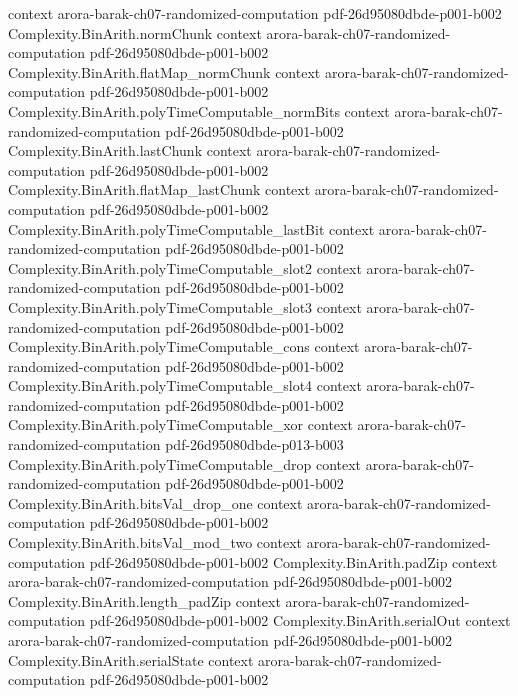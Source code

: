 \begin{theorem}
  {context}
  {arora-barak-ch07-randomized-computation}
  {pdf-26d95080dbde-p001-b002}
\proofstep
  {Complexity.BinArith.normChunk}
  {context}
  {arora-barak-ch07-randomized-computation}
  {pdf-26d95080dbde-p001-b002}
\proofstep
  {Complexity.BinArith.flatMap_normChunk}
  {context}
  {arora-barak-ch07-randomized-computation}
  {pdf-26d95080dbde-p001-b002}
\proofstep
  {Complexity.BinArith.polyTimeComputable_normBits}
  {context}
  {arora-barak-ch07-randomized-computation}
  {pdf-26d95080dbde-p001-b002}
\proofstep
  {Complexity.BinArith.lastChunk}
  {context}
  {arora-barak-ch07-randomized-computation}
  {pdf-26d95080dbde-p001-b002}
\proofstep
  {Complexity.BinArith.flatMap_lastChunk}
  {context}
  {arora-barak-ch07-randomized-computation}
  {pdf-26d95080dbde-p001-b002}
\proofstep
  {Complexity.BinArith.polyTimeComputable_lastBit}
  {context}
  {arora-barak-ch07-randomized-computation}
  {pdf-26d95080dbde-p001-b002}
\proofstep
  {Complexity.BinArith.polyTimeComputable_slot2}
  {context}
  {arora-barak-ch07-randomized-computation}
  {pdf-26d95080dbde-p001-b002}
\proofstep
  {Complexity.BinArith.polyTimeComputable_slot3}
  {context}
  {arora-barak-ch07-randomized-computation}
  {pdf-26d95080dbde-p001-b002}
\proofstep
  {Complexity.BinArith.polyTimeComputable_cons}
  {context}
  {arora-barak-ch07-randomized-computation}
  {pdf-26d95080dbde-p001-b002}
\proofstep
  {Complexity.BinArith.polyTimeComputable_slot4}
  {context}
  {arora-barak-ch07-randomized-computation}
  {pdf-26d95080dbde-p001-b002}
\proofstep
  {Complexity.BinArith.polyTimeComputable_xor}
  {context}
  {arora-barak-ch07-randomized-computation}
  {pdf-26d95080dbde-p013-b003}
\proofstep
  {Complexity.BinArith.polyTimeComputable_drop}
  {context}
  {arora-barak-ch07-randomized-computation}
  {pdf-26d95080dbde-p001-b002}
\proofstep
  {Complexity.BinArith.bitsVal_drop_one}
  {context}
  {arora-barak-ch07-randomized-computation}
  {pdf-26d95080dbde-p001-b002}
\proofstep
  {Complexity.BinArith.bitsVal_mod_two}
  {context}
  {arora-barak-ch07-randomized-computation}
  {pdf-26d95080dbde-p001-b002}
\proofstep
  {Complexity.BinArith.padZip}
  {context}
  {arora-barak-ch07-randomized-computation}
  {pdf-26d95080dbde-p001-b002}
\proofstep
  {Complexity.BinArith.length_padZip}
  {context}
  {arora-barak-ch07-randomized-computation}
  {pdf-26d95080dbde-p001-b002}
\proofstep
  {Complexity.BinArith.serialOut}
  {context}
  {arora-barak-ch07-randomized-computation}
  {pdf-26d95080dbde-p001-b002}
\proofstep
  {Complexity.BinArith.serialState}
  {context}
  {arora-barak-ch07-randomized-computation}
  {pdf-26d95080dbde-p001-b002}

\end{theorem}
